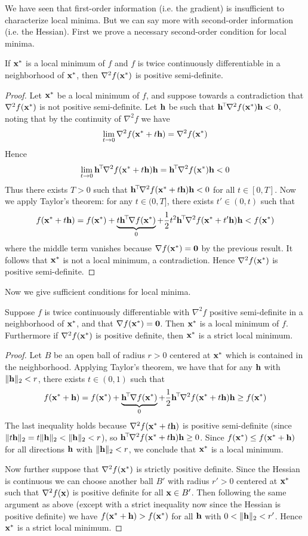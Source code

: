 We have seen that first-order information (i.e. the gradient) is insufficient to characterize local minima.
But we can say more with second-order information (i.e. the Hessian).
First we prove a necessary second-order condition for local minima.
\begin{proposition}
If $\mathbf{x}^*$ is a local minimum of $f$ and $f$ is twice continuously differentiable in a neighborhood of $\mathbf{x}^*$, then $\nabla^2 f(\mathbf{x}^*)$ is positive semi-definite.
\end{proposition}
\begin{proof}
Let $\mathbf{x}^*$ be a local minimum of $f$, and suppose towards a contradiction that $\nabla^2 f(\mathbf{x}^*)$ is not positive semi-definite.
Let $\mathbf{h}$ be such that $\mathbf{h}^{\!\top\!}\nabla^2 f(\mathbf{x}^*)\mathbf{h} < 0$, noting that by the continuity of $\nabla^2 f$ we have
\[\lim_{t \to 0} \nabla^2 f(\mathbf{x}^* + t\mathbf{h}) = \nabla^2 f(\mathbf{x}^*)\]
Hence
\[\lim_{t \to 0} \mathbf{h}^{\!\top\!}\nabla^2 f(\mathbf{x}^* + t\mathbf{h})\mathbf{h} = \mathbf{h}^{\!\top\!}\nabla^2 f(\mathbf{x}^*)\mathbf{h} < 0\]
Thus there exists $T > 0$ such that $\mathbf{h}^{\!\top\!}\nabla^2 f(\mathbf{x}^* + t\mathbf{h})\mathbf{h} < 0$ for all $t \in [0,T]$.
Now we apply Taylor's theorem: for any $t \in (0,T]$, there exists $t' \in (0,t)$ such that
\[f(\mathbf{x}^* + t\mathbf{h}) = f(\mathbf{x}^*) + \underbrace{t\mathbf{h}^{\!\top\!}\nabla f(\mathbf{x}^*)}_0 + \frac{1}{2}t^2\mathbf{h}^{\!\top\!}\nabla^2 f(\mathbf{x}^* + t'\mathbf{h})\mathbf{h} < f(\mathbf{x}^*)\]
where the middle term vanishes because $\nabla f(\mathbf{x}^*) = \mathbf{0}$ by the previous result.
It follows that $\mathbf{x}^*$ is not a local minimum, a contradiction.
Hence $\nabla^2 f(\mathbf{x}^*)$ is positive semi-definite.
\end{proof}
Now we give sufficient conditions for local minima.
\begin{proposition}
Suppose $f$ is twice continuously differentiable with $\nabla^2 f$ positive semi-definite in a neighborhood of $\mathbf{x}^*$, and that $\nabla f(\mathbf{x}^*) = \mathbf{0}$.
Then $\mathbf{x}^*$ is a local minimum of $f$.
Furthermore if $\nabla^2 f(\mathbf{x}^*)$ is positive definite, then $\mathbf{x}^*$ is a strict local minimum.
\end{proposition}
\begin{proof}
Let $B$ be an open ball of radius $r > 0$ centered at $\mathbf{x}^*$ which is contained in the neighborhood.
Applying Taylor's theorem, we have that for any $\mathbf{h}$ with $\|\mathbf{h}\|_2 < r$, there exists $t \in (0,1)$ such that
\[f(\mathbf{x}^* + \mathbf{h}) = f(\mathbf{x}^*) + \underbrace{\mathbf{h}^{\!\top\!}\nabla f(\mathbf{x}^*)}_0 + \frac{1}{2}\mathbf{h}^{\!\top\!}\nabla^2 f(\mathbf{x}^* + t\mathbf{h})\mathbf{h} \geq f(\mathbf{x}^*)\]
The last inequality holds because $\nabla^2 f(\mathbf{x}^* + t\mathbf{h})$ is positive semi-definite (since $\|t\mathbf{h}\|_2 = t\|\mathbf{h}\|_2 < \|\mathbf{h}\|_2 < r$), so $\mathbf{h}^{\!\top\!}\nabla^2 f(\mathbf{x}^* + t\mathbf{h})\mathbf{h} \geq 0$.
Since $f(\mathbf{x}^*) \leq f(\mathbf{x}^* + \mathbf{h})$ for all directions $\mathbf{h}$ with $\|\mathbf{h}\|_2 < r$, we conclude that $\mathbf{x}^*$ is a local minimum.

Now further suppose that $\nabla^2 f(\mathbf{x}^*)$ is strictly positive definite.
Since the Hessian is continuous we can choose another ball $B'$ with radius $r' > 0$ centered at $\mathbf{x}^*$ such that $\nabla^2 f(\mathbf{x})$ is positive definite for all $\mathbf{x} \in B'$.
Then following the same argument as above (except with a strict inequality now since the Hessian is positive definite) we have $f(\mathbf{x}^* + \mathbf{h}) > f(\mathbf{x}^*)$ for all $\mathbf{h}$ with $0 < \|\mathbf{h}\|_2 < r'$.
Hence $\mathbf{x}^*$ is a strict local minimum.
\end{proof}
